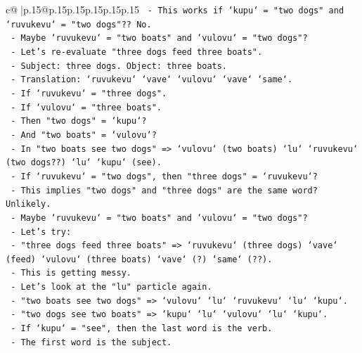 \documentclass{article}
\begin{document}
{\begin{supertabular}{c@{$\;$}|p{.15\linewidth}@{}p{.15\linewidth}p{.15\linewidth}p{.15\linewidth}p{.15\linewidth}p{.15\linewidth}}
{{{\texttt{                 {-} This works if `kupu` = "two dogs" and `ruvukevu` = "two dogs"?? No.} \\
\texttt{                 {-} Maybe `ruvukevu` = "two boats" and `vulovu` = "two dogs"?} \\
\texttt{                 {-} Let's re{-}evaluate "three dogs feed three boats".} \\
\texttt{                   {-} Subject: three dogs. Object: three boats.} \\
\texttt{                   {-} Translation: `ruvukevu` `vave` `vulovu` `vave` `same`.} \\
\texttt{                   {-} If `ruvukevu` = "three dogs".} \\
\texttt{                   {-} If `vulovu` = "three boats".} \\
\texttt{                   {-} Then "two dogs" = `kupu`?} \\
\texttt{                   {-} And "two boats" = `vulovu`?} \\
\texttt{                   {-} In "two boats see two dogs" => `vulovu` (two boats) `lu` `ruvukevu` (two dogs??) `lu` `kupu` (see).} \\
\texttt{                   {-} If `ruvukevu` = "two dogs", then "three dogs" = `ruvukevu`?} \\
\texttt{                   {-} This implies "two dogs" and "three dogs" are the same word? Unlikely.} \\
\texttt{                   {-} Maybe `ruvukevu` = "two boats" and `vulovu` = "two dogs"?} \\
\texttt{                   {-} Let's try:} \\
\texttt{                     {-} "three dogs feed three boats" => `ruvukevu` (three dogs) `vave` (feed) `vulovu` (three boats) `vave` (?) `same` (??).} \\
\texttt{                     {-} This is getting messy.} \\
\texttt{                   {-} Let's look at the "lu" particle again.} \\
\texttt{                     {-} "two boats see two dogs" => `vulovu` `lu` `ruvukevu` `lu` `kupu`.} \\
\texttt{                     {-} "two dogs see two boats" => `kupu` `lu` `vulovu` `lu` `kupu`.} \\
\texttt{                     {-} If `kupu` = "see", then the last word is the verb.} \\
\texttt{                     {-} The first word is the subject.} \\
}}}
\end{supertabular}}
\end{document}
